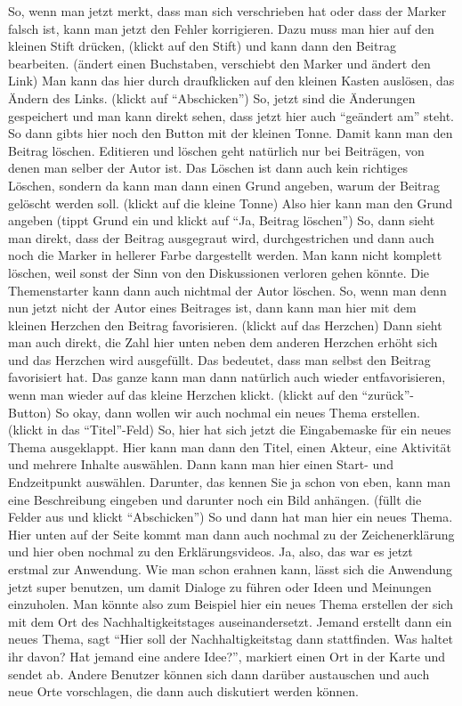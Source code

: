 So, wenn man jetzt merkt, dass man sich verschrieben hat oder dass der Marker falsch ist, kann man jetzt den Fehler korrigieren. Dazu muss man hier auf den kleinen Stift dr{\"u}cken, (klickt auf den Stift) und kann dann den Beitrag bearbeiten. ({\"a}ndert einen Buchstaben, verschiebt den Marker und {\"a}ndert den Link) Man kann das hier durch draufklicken auf den kleinen Kasten ausl{\"o}sen, das {\"A}ndern des Links. (klickt auf "`Abschicken"') So, jetzt sind die {\"A}nderungen gespeichert und man kann direkt sehen, dass jetzt hier auch "`ge{\"a}ndert am"' steht. So dann gibts hier noch den Button mit der kleinen Tonne. Damit kann man den Beitrag l{\"o}schen. Editieren und l{\"o}schen geht nat{\"u}rlich nur bei Beitr{\"a}gen, von denen man selber der Autor ist. Das L{\"o}schen ist dann auch kein richtiges L{\"o}schen, sondern da kann man dann einen Grund angeben, warum der Beitrag gel{\"o}scht werden soll. (klickt auf die kleine Tonne) Also hier kann man den Grund angeben (tippt Grund ein und klickt auf "`Ja, Beitrag l{\"o}schen"') So, dann sieht man direkt, dass der Beitrag ausgegraut wird, durchgestrichen und dann auch noch die Marker in hellerer Farbe dargestellt werden. Man kann nicht komplett l{\"o}schen, weil sonst der Sinn von den Diskussionen verloren gehen k{\"o}nnte. Die Themenstarter kann dann auch nichtmal der Autor l{\"o}schen. So, wenn man denn nun jetzt nicht der Autor eines Beitrages ist, dann kann man hier mit dem kleinen Herzchen den Beitrag favorisieren. (klickt auf das Herzchen) Dann sieht man auch direkt, die Zahl hier unten neben dem anderen Herzchen erh{\"o}ht sich und das Herzchen wird ausgef{\"u}llt. Das bedeutet, dass man selbst den Beitrag favorisiert hat. Das ganze kann man dann nat{\"u}rlich auch wieder entfavorisieren, wenn man wieder auf das kleine Herzchen klickt. (klickt auf den "`zur{\"u}ck"'-Button) So okay, dann wollen wir auch nochmal ein neues Thema erstellen. (klickt in das "`Titel"'-Feld) So, hier hat sich jetzt die Eingabemaske f{\"u}r ein neues Thema ausgeklappt. Hier kann man dann den Titel, einen Akteur, eine Aktivit{\"a}t und mehrere Inhalte ausw{\"a}hlen. Dann kann man hier einen Start- und Endzeitpunkt ausw{\"a}hlen. Darunter, das kennen Sie ja schon von eben, kann man eine Beschreibung eingeben und darunter noch ein Bild anh{\"a}ngen. (f{\"u}llt die Felder aus und klickt "`Abschicken"') So und dann hat man hier ein neues Thema.\\
Hier unten auf der Seite kommt man dann auch nochmal zu der Zeichenerkl{\"a}rung und hier oben nochmal zu den Erkl{\"a}rungsvideos. Ja, also, das war es jetzt erstmal zur Anwendung. Wie man schon erahnen kann, l{\"a}sst sich die Anwendung jetzt super benutzen, um damit Dialoge zu f{\"u}hren oder Ideen und Meinungen einzuholen. Man k{\"o}nnte also zum Beispiel hier ein neues Thema erstellen der sich mit dem Ort des Nachhaltigkeitstages auseinandersetzt. Jemand erstellt dann ein neues Thema, sagt "`Hier soll der Nachhaltigkeitstag dann stattfinden. Was haltet ihr davon? Hat jemand eine andere Idee?"', markiert einen Ort in der Karte und sendet ab. Andere Benutzer k{\"o}nnen sich dann dar{\"u}ber austauschen und auch neue Orte vorschlagen, die dann auch diskutiert werden k{\"o}nnen.
